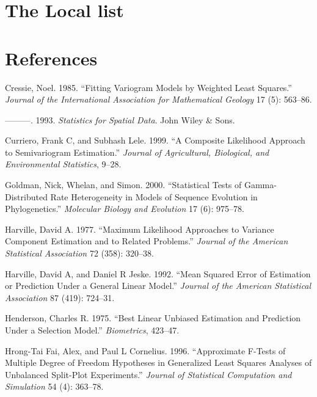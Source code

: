 \documentclass{article}
\begin{document}
\hypertarget{the-local-list}{%
\section{The Local list}\label{the-local-list}}

\hypertarget{references}{%
\section*{References}\label{references}}

\hypertarget{refs}{}
\leavevmode\hypertarget{ref-cressie1985fitting}{}%
Cressie, Noel. 1985. ``Fitting Variogram Models by Weighted Least
Squares.'' \emph{Journal of the International Association for
Mathematical Geology} 17 (5): 563--86.

\leavevmode\hypertarget{ref-cressie1993statistics}{}%
---------. 1993. \emph{Statistics for Spatial Data}. John Wiley \& Sons.

\leavevmode\hypertarget{ref-curriero1999composite}{}%
Curriero, Frank C, and Subhash Lele. 1999. ``A Composite Likelihood
Approach to Semivariogram Estimation.'' \emph{Journal of Agricultural,
Biological, and Environmental Statistics}, 9--28.

\leavevmode\hypertarget{ref-goldman2000statistical}{}%
Goldman, Nick, Whelan, and Simon. 2000. ``Statistical Tests of
Gamma-Distributed Rate Heterogeneity in Models of Sequence Evolution in
Phylogenetics.'' \emph{Molecular Biology and Evolution} 17 (6): 975--78.

\leavevmode\hypertarget{ref-harville1977maximum}{}%
Harville, David A. 1977. ``Maximum Likelihood Approaches to Variance
Component Estimation and to Related Problems.'' \emph{Journal of the
American Statistical Association} 72 (358): 320--38.

\leavevmode\hypertarget{ref-harville1992mean}{}%
Harville, David A, and Daniel R Jeske. 1992. ``Mean Squared Error of
Estimation or Prediction Under a General Linear Model.'' \emph{Journal
of the American Statistical Association} 87 (419): 724--31.

\leavevmode\hypertarget{ref-henderson1975best}{}%
Henderson, Charles R. 1975. ``Best Linear Unbiased Estimation and
Prediction Under a Selection Model.'' \emph{Biometrics}, 423--47.

\leavevmode\hypertarget{ref-hrong1996approximate}{}%
Hrong-Tai Fai, Alex, and Paul L Cornelius. 1996. ``Approximate F-Tests
of Multiple Degree of Freedom Hypotheses in Generalized Least Squares
Analyses of Unbalanced Split-Plot Experiments.'' \emph{Journal of
Statistical Computation and Simulation} 54 (4): 363--78.
\end{document}
